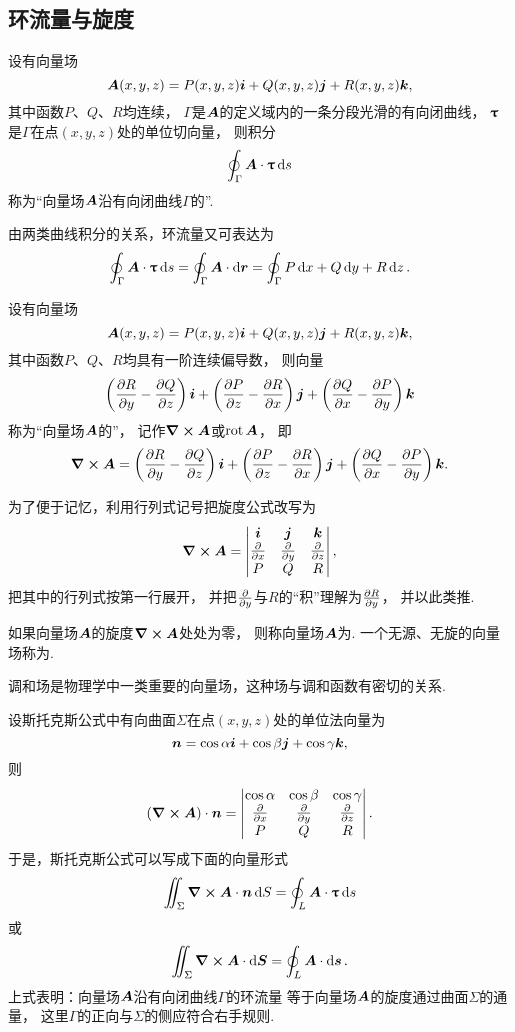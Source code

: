 \subsection{环流量与旋度}
\begin{definition}
设有向量场\[
\boldsymbol{A}(x,y,z)=P(x,y,z)\boldsymbol{i}+Q(x,y,z)\boldsymbol{j}+R(x,y,z)\boldsymbol{k},
\]其中函数\(P\)、\(Q\)、\(R\)均连续，
\(\Gamma\)是\(\boldsymbol{A}\)的定义域内的一条分段光滑的有向闭曲线，
\(\boldsymbol{\uptau}\)是\(\Gamma\)在点\((x,y,z)\)处的单位切向量，
则积分\[
	\oint_\Gamma \boldsymbol{A}\cdot\boldsymbol{\uptau}\dd{s}
\]称为“向量场\(\boldsymbol{A}\)沿有向闭曲线\(\Gamma\)的”.
\end{definition}
由两类曲线积分的关系，环流量又可表达为\[
	\oint_\Gamma \boldsymbol{A}\cdot\boldsymbol{\uptau}\dd{s}
	=\oint_\Gamma \boldsymbol{A}\cdot\dd{\boldsymbol{r}}
	=\oint_\Gamma P\dd{x}+Q\dd{y}+R\dd{z}.
\]

\begin{definition}
设有向量场\[
	\boldsymbol{A}(x,y,z)=P(x,y,z)\boldsymbol{i}+Q(x,y,z)\boldsymbol{j}+R(x,y,z)\boldsymbol{k},
\]
其中函数\(P\)、\(Q\)、\(R\)均具有一阶连续偏导数，
则向量\[
	\left( \pdv{R}{y} - \pdv{Q}{z} \right)\boldsymbol{i}
	+\left( \pdv{P}{z} - \pdv{R}{x} \right)\boldsymbol{j}
	+\left( \pdv{Q}{x} - \pdv{P}{y} \right)\boldsymbol{k}
\]
称为“向量场\(\boldsymbol{A}\)的”，
记作\(\curl{\boldsymbol{A}}\)或\(\operatorname{rot}\boldsymbol{A}\)，
即\[
	\curl{\boldsymbol{A}}
	=\left( \pdv{R}{y} - \pdv{Q}{z} \right)\boldsymbol{i}
	+\left( \pdv{P}{z} - \pdv{R}{x} \right)\boldsymbol{j}
	+\left( \pdv{Q}{x} - \pdv{P}{y} \right)\boldsymbol{k}.
\]
\end{definition}

为了便于记忆，利用行列式记号把旋度公式改写为\[
	\curl{\boldsymbol{A}}
	=\begin{vmatrix}
		\boldsymbol{i} & \boldsymbol{j} & \boldsymbol{k} \\
		\pdv{x} & \pdv{y} & \pdv{z} \\
		P & Q & R \\
	\end{vmatrix},
\]
把其中的行列式按第一行展开，
并把\(\pdv{y}\)与\(R\)的“积”理解为\(\pdv{R}{y}\)，
并以此类推.

\begin{definition}
如果向量场\(\boldsymbol{A}\)的旋度\(\curl{\boldsymbol{A}}\)处处为零，
则称向量场\(\boldsymbol{A}\)为.
一个无源、无旋的向量场称为.
\end{definition}
调和场是物理学中一类重要的向量场，这种场与调和函数有密切的关系.

设斯托克斯公式中有向曲面\(\Sigma\)在点\((x,y,z)\)处的单位法向量为\[
	\boldsymbol{n} = \cos\alpha \boldsymbol{i} + \cos\beta \boldsymbol{j} + \cos\gamma \boldsymbol{k},
\]
则\[
	(\curl{\boldsymbol{A}}) \cdot \boldsymbol{n} = \begin{vmatrix}
		\cos\alpha & \cos\beta & \cos\gamma \\
		\pdv{x} & \pdv{y} & \pdv{z} \\
		P & Q & R \\
	\end{vmatrix}.
\]
于是，斯托克斯公式可以写成下面的向量形式\[
	\iint_\Sigma \curl{\boldsymbol{A}} \cdot \boldsymbol{n} \dd{S}
	= \oint_L \boldsymbol{A} \cdot \boldsymbol{\uptau} \dd{s}
\]或\[
	\iint_\Sigma \curl{\boldsymbol{A}} \cdot \dd{\boldsymbol{S}}
	= \oint_L \boldsymbol{A} \cdot \dd{\boldsymbol{s}}.
\]
上式表明：向量场\(\boldsymbol{A}\)沿有向闭曲线\(\Gamma\)的环流量
等于向量场\(\boldsymbol{A}\)的旋度通过曲面\(\Sigma\)的通量，
这里\(\Gamma\)的正向与\(\Sigma\)的侧应符合右手规则.

